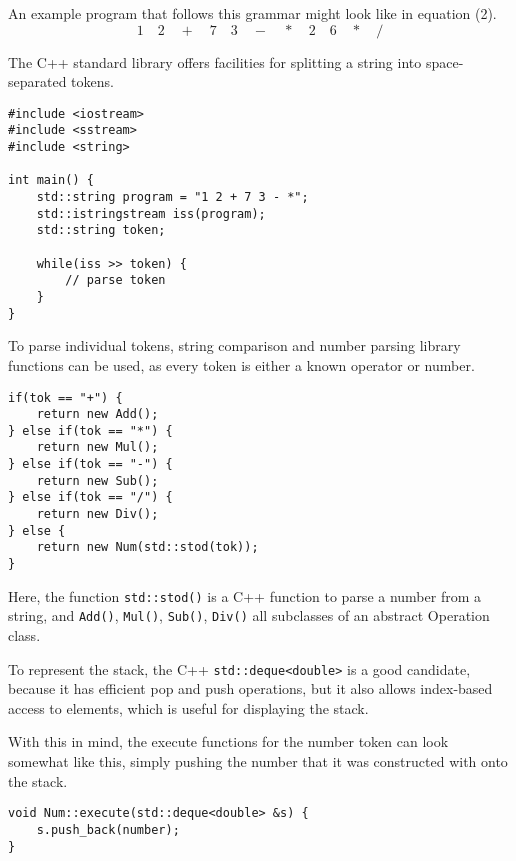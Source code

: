 \documentclass[a4paper,twocolumn]{article}
\begin{document}
An example program that follows this grammar might look like in equation (2).
\begin{equation}
1\quad2\quad+\quad7\quad3\quad-\quad*\quad2\quad6\quad*\quad/  
\end{equation}

The C++ standard library offers facilities for splitting a string into space-separated tokens.

\begin{verbatim}
#include <iostream>
#include <sstream>
#include <string>

int main() {
    std::string program = "1 2 + 7 3 - *";
    std::istringstream iss(program);
    std::string token;

    while(iss >> token) {
        // parse token
    }
}  
\end{verbatim}

To parse individual tokens, string comparison and number parsing library functions can be used, as every token is either a known operator or number.

\begin{verbatim}
if(tok == "+") {
    return new Add();
} else if(tok == "*") {
    return new Mul();
} else if(tok == "-") {
    return new Sub();
} else if(tok == "/") {
    return new Div();
} else {
    return new Num(std::stod(tok));
}
\end{verbatim}

Here, the function \verb|std::stod()| is a C++ function to parse a number from a string, and \verb|Add()|, \verb|Mul()|, \verb|Sub()|, \verb|Div()| all subclasses of an abstract Operation class.

To represent the stack, the C++ \verb|std::deque<double>| is a good candidate, because it has efficient pop and push operations, but it also allows index-based access to elements, which is useful for displaying the stack.

With this in mind, the execute functions for the number token can look somewhat like this, simply pushing the number that it was constructed with onto the stack.

\begin{verbatim}
void Num::execute(std::deque<double> &s) {                                                                                                                                                           
    s.push_back(number);                                                                                                                                                                                
}  
\end{verbatim}
\end{document}
